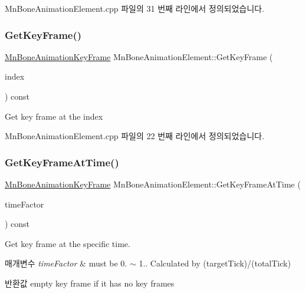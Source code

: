 Mn\+Bone\+Animation\+Element.\+cpp 파일의 31 번째 라인에서 정의되었습니다.

\mbox{\label{class_m_n_l_1_1_mn_bone_animation_element_a8cd10f7f60f232471e6ce603cdbf76ea}} 
\subsubsection{\texorpdfstring{Get\+Key\+Frame()}{GetKeyFrame()}}
{\footnotesize\ttfamily \hyperlink{struct_m_n_l_1_1_mn_bone_animation_key_frame}{Mn\+Bone\+Animation\+Key\+Frame} Mn\+Bone\+Animation\+Element\+::\+Get\+Key\+Frame (\begin{DoxyParamCaption}\item[{U\+I\+NT}]{index }\end{DoxyParamCaption}) const}

Get key frame at the index 

Mn\+Bone\+Animation\+Element.\+cpp 파일의 22 번째 라인에서 정의되었습니다.

\mbox{\label{class_m_n_l_1_1_mn_bone_animation_element_a58874b3fe81886f1c13ca6f77b4a171c}} 
\subsubsection{\texorpdfstring{Get\+Key\+Frame\+At\+Time()}{GetKeyFrameAtTime()}}
{\footnotesize\ttfamily \hyperlink{struct_m_n_l_1_1_mn_bone_animation_key_frame}{Mn\+Bone\+Animation\+Key\+Frame} Mn\+Bone\+Animation\+Element\+::\+Get\+Key\+Frame\+At\+Time (\begin{DoxyParamCaption}\item[{float}]{time\+Factor }\end{DoxyParamCaption}) const}

Get key frame at the specific time. 
\begin{DoxyParams}{매개변수}
{\em time\+Factor} & must be 0. $\sim$ 1.. Calculated by (target\+Tick)/(total\+Tick) \\
\hline
\end{DoxyParams}
\begin{DoxyReturn}{반환값}
empty key frame if it has no key frames 
\end{DoxyReturn}


